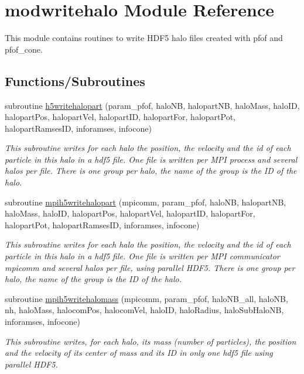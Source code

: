 \hypertarget{namespacemodwritehalo}{}\section{modwritehalo Module Reference}
\label{namespacemodwritehalo}


This module contains routines to write H\+D\+F5 halo files created with pfof and pfof\+\_\+cone.  


\subsection*{Functions/\+Subroutines}
\begin{DoxyCompactItemize}
\item 
subroutine \hyperlink{namespacemodwritehalo_a3e00317bab6230ca8987e14b62b79874}{h5writehalopart} (param\+\_\+pfof, halo\+NB, halopart\+NB, halo\+Mass, halo\+ID, halopart\+Pos, halopart\+Vel, halopart\+ID, halopart\+For, halopart\+Pot, halopart\+Ramses\+ID, inforamses, infocone)
\begin{DoxyCompactList}\small\item\em This subroutine writes for each halo the position, the velocity and the id of each particle in this halo in a hdf5 file. One file is written per M\+PI process and several halos per file. There is one group per halo, the name of the group is the ID of the halo. \end{DoxyCompactList}\item 
subroutine \hyperlink{namespacemodwritehalo_a7de4785bb81feb8a4b806bd18a65bf4d}{mpih5writehalopart} (mpicomm, param\+\_\+pfof, halo\+NB, halopart\+NB, halo\+Mass, halo\+ID, halopart\+Pos, halopart\+Vel, halopart\+ID, halopart\+For, halopart\+Pot, halopart\+Ramses\+ID, inforamses, infocone)
\begin{DoxyCompactList}\small\item\em This subroutine writes for each halo the position, the velocity and the id of each particle in this halo in a hdf5 file. One file is written per M\+PI communicator mpicomm and several halos per file, using parallel H\+D\+F5. There is one group per halo, the name of the group is the ID of the halo. \end{DoxyCompactList}\item 
subroutine \hyperlink{namespacemodwritehalo_a9f9dfc9671a5f395219212ba8d45204b}{mpih5writehalomass} (mpicomm, param\+\_\+pfof, halo\+N\+B\+\_\+all, halo\+NB, nh, halo\+Mass, halocom\+Pos, halocom\+Vel, halo\+ID, halo\+Radius, halo\+Sub\+Halo\+NB, inforamses, infocone)
\begin{DoxyCompactList}\small\item\em This subroutine writes, for each halo, its mass (number of particles), the position and the velocity of its center of mass and its ID in only one hdf5 file using parallel H\+D\+F5. \end{DoxyCompactList}\end{DoxyCompactItemize}


